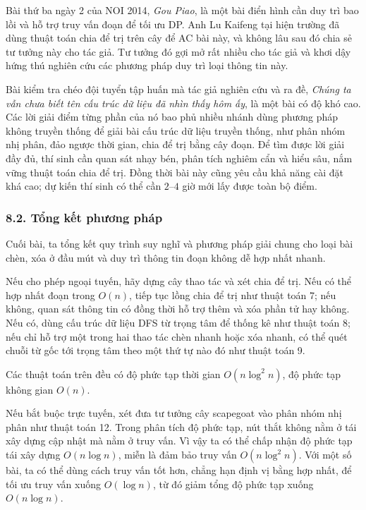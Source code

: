 \documentclass[11pt]{article}
\begin{document}
Bài thứ ba ngày 2 của NOI 2014, \emph{Gou Piao}, là một bài điển hình cần duy
trì bao lồi và hỗ trợ truy vấn đoạn để tối ưu DP. Anh Lu Kaifeng tại hiện
trường đã dùng thuật toán chia để trị trên cây để AC bài này, và không lâu sau
đó chia sẻ tư tưởng này cho tác giả. Tư tưởng đó gợi mở rất nhiều cho tác giả
và khơi dậy hứng thú nghiên cứu các phương pháp duy trì loại thông tin này.

Bài kiểm tra chéo đội tuyển tập huấn mà tác giả nghiên cứu và ra đề,
\emph{Chúng ta vẫn chưa biết tên cấu trúc dữ liệu đã nhìn thấy hôm ấy}, là một
bài có độ khó cao. Các lời giải điểm từng phần của nó bao phủ nhiều nhánh dùng
phương pháp không truyền thống để giải bài cấu trúc dữ liệu truyền thống, như
phân nhóm nhị phân, đảo ngược thời gian, chia để trị bằng cây đoạn. Để tìm
được lời giải đầy đủ, thí sinh cần quan sát nhạy bén, phân tích nghiêm cẩn và
hiểu sâu, nắm vững thuật toán chia để trị. Đồng thời bài này cũng yêu cầu khả
năng cài đặt khá cao; dự kiến thí sinh có thể cần \(2\)--\(4\) giờ mới lấy
được toàn bộ điểm.

\subsubsection*{8.2. Tổng kết phương pháp}

Cuối bài, ta tổng kết quy trình suy nghĩ và phương pháp giải chung cho loại
bài chèn, xóa ở đầu mút và duy trì thông tin đoạn không dễ hợp nhất nhanh.

Nếu cho phép ngoại tuyến, hãy dựng cây thao tác và xét chia để trị. Nếu có thể
hợp nhất đoạn trong \(O(n)\), tiếp tục lồng chia để trị như thuật toán 7; nếu
không, quan sát thông tin có đồng thời hỗ trợ thêm và xóa phần tử hay không.
Nếu có, dùng cấu trúc dữ liệu DFS từ trọng tâm để thống kê như thuật toán 8;
nếu chỉ hỗ trợ một trong hai thao tác chèn nhanh hoặc xóa nhanh, có thể quét
chuỗi từ gốc tới trọng tâm theo một thứ tự nào đó như thuật toán 9.

Các thuật toán trên đều có độ phức tạp thời gian \(O(n\log^2 n)\), độ phức tạp
không gian \(O(n)\).

Nếu bắt buộc trực tuyến, xét đưa tư tưởng cây scapegoat vào phân nhóm nhị phân
như thuật toán 12. Trong phân tích độ phức tạp, nút thắt không nằm ở tái xây
dựng cập nhật mà nằm ở truy vấn. Vì vậy ta có thể chấp nhận độ phức tạp tái
xây dựng \(O(n\log n)\), miễn là đảm bảo truy vấn \(O(n\log^2 n)\). Với một số
bài, ta có thể dùng cách truy vấn tốt hơn, chẳng hạn định vị bằng hợp nhất, để
tối ưu truy vấn xuống \(O(\log n)\), từ đó giảm tổng độ phức tạp xuống
\(O(n\log n)\).
\end{document}
